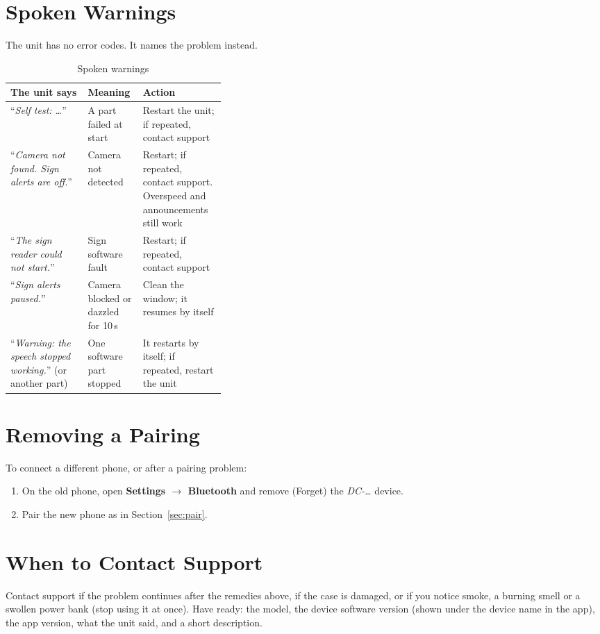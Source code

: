 \documentclass[11pt,a4paper,oneside]{report}
\newcommand{\hdr}[1]{\cellcolor{LightBlue}\textbf{#1}}
\newcommand{\menu}[1]{\textsf{\textbf{#1}}}
\newcommand{\ui}[1]{\textsf{#1}}
\newcommand{\say}[1]{``\textit{#1}''}
\begin{document}
\section{Spoken Warnings}
The unit has no error codes. It names the problem instead.
\begin{table}[H]\centering\small
\caption{Spoken warnings}\label{tab:errors}
\begin{tabularx}{\linewidth}{|>{\raggedright\arraybackslash}p{0.36\linewidth}|l|X|}\hline
\hdr{The unit says} & \hdr{Meaning} & \hdr{Action}\\ \hline
\say{Self test: \ldots} & A part failed at start & Restart the unit; if repeated, contact support\\ \hline
\say{Camera not found. Sign alerts are off.} & Camera not detected & Restart; if repeated, contact support. Overspeed and announcements still work\\ \hline
\say{The sign reader could not start.} & Sign software fault & Restart; if repeated, contact support\\ \hline
\say{Sign alerts paused.} & Camera blocked or dazzled for 10\,s & Clean the window; it resumes by itself\\ \hline
\say{Warning: the speech stopped working.} (or another part) & One software part stopped & It restarts by itself; if repeated, restart the unit\\ \hline
\end{tabularx}\end{table}

\section{Removing a Pairing}
To connect a different phone, or after a pairing problem:
\begin{enumerate}[leftmargin=*]
\item On the old phone, open \menu{Settings $\rightarrow$ Bluetooth} and remove (\ui{Forget}) the \emph{DC-\ldots} device.
\item Pair the new phone as in Section~\ref{sec:pair}.
\end{enumerate}

\section{When to Contact Support}
Contact support if the problem continues after the remedies above, if the case is damaged, or if you notice smoke, a burning smell or a swollen power bank (stop using it at once). Have ready: the model, the device software version (shown under the device name in the app), the app version, what the unit said, and a short description.
\end{document}
